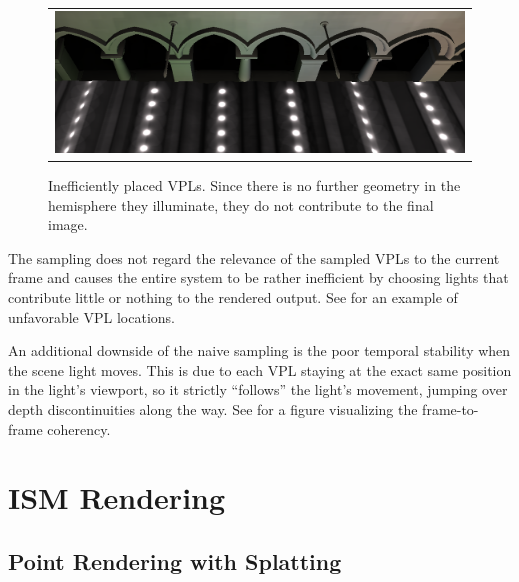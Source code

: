 \begin{figure}[htb]
\centering
  \begin{tabular}{@{}c@{}}
    \includegraphics[width=1.0\textwidth]{screenshots/RSM_unfavorable} \\
  \end{tabular}
  \caption{Inefficiently placed VPLs. Since there is no further geometry in the hemisphere they illuminate, they do not contribute to the final image.}
  \label{fig:results:RSMUnfavorable}
\end{figure}

The sampling does not regard the relevance of the sampled VPLs to the current frame and causes the entire system to be rather inefficient by choosing lights that contribute little or nothing to the rendered output. See  for an example of unfavorable VPL locations.

An additional downside of the naive sampling is the poor temporal stability when the scene light moves. This is due to each VPL staying at the exact same position in the light's viewport, so it strictly ``follows'' the light's movement, jumping over depth discontinuities along the way. See  for a figure visualizing the frame-to-frame coherency.



\section{ISM Rendering}

\subsection{Point Rendering with Splatting}






